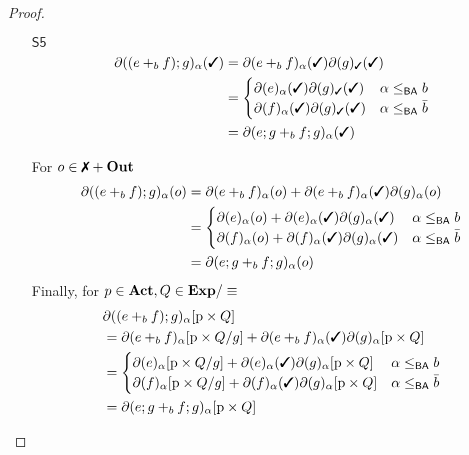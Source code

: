 \documentclass[a4paper,UKenglish,cleveref, autoref, thm-restate]{lipics-v2021}
\newcommand{\cmark}{\text{\ding{51}}}
\newcommand{\xmark}{\text{\ding{55}}}
\newcommand{\Out}{\textbf{\upshape{Out}}}
\newcommand{\Act}{\textbf{\upshape{Act}}}
\newcommand{\Exp}{\textbf{\upshape{Exp}}}
\newcommand{\BA}{\textsf{BA}}
\newcommand{\Ax}[1]{\ensuremath{\mathsf{#1}}}
\theoremstyle{plain}\newtheoremrep{thm}{Theorem}[section]
\begin{document}
\begin{toappendix}
\begin{proof}
\begin{enumerate}
				\item[\Ax{S5}] 
				\begin{align*}
					\partial((e+_bf);g)_\alpha(\cmark) &= \partial(e+_bf)_\alpha(\cmark)\partial(g)_\cmark(\cmark)\\
					&= \begin{cases}
						\partial(e)_\alpha(\cmark)\partial(g)_\cmark(\cmark) & \alpha \leq_{\BA} b\\
						\partial(f)_\alpha(\cmark)\partial(g)_\cmark(\cmark) & \alpha \leq_{\BA} \bar b\\
					\end{cases}\\
					&= \partial(e;g +_b f;g)_\alpha(\cmark)
				\end{align*}		
				
				For $o \in \xmark + \Out$ 
				\begin{align*}
					\partial((e+_bf);g)_\alpha(o) &= \partial(e+_bf)_\alpha(o) + \partial(e+_bf)_\alpha(\cmark)\partial(g)_\alpha(o)\\
					&= \begin{cases}
						\partial(e)_\alpha(o)+\partial(e)_\alpha(\cmark)\partial(g)_\alpha(\cmark) & \alpha \leq_{\BA} b\\
						\partial(f)_\alpha(o)+\partial(f)_\alpha(\cmark)\partial(g)_\alpha(\cmark) & \alpha \leq_{\BA} \bar b\\
					\end{cases}\\
					&= \partial(e;g +_b f;g)_\alpha(o)
				\end{align*}
				Finally, for $p \in \Act, Q \in \Exp/\equiv$
				\begin{align*}
					&\partial((e+_bf);g)_\alpha[\text{p} \times Q]\\
					&= \partial(e+_bf)_\alpha[\text{p} \times Q/g] + \partial(e+_bf)_\alpha(\cmark)\partial(g)_\alpha[\text{p} \times Q]\\
					&= \begin{cases}
						\partial(e)_\alpha[\text{p} \times Q/g] + \partial(e)_\alpha(\cmark)\partial(g)_\alpha[\text{p} \times Q] & \alpha \leq_{\BA} b\\
						\partial(f)_\alpha[\text{p} \times Q/g] + \partial(f)_\alpha(\cmark)\partial(g)_\alpha[\text{p} \times Q] & \alpha \leq_{\BA} \bar b\\
					\end{cases}\\
					&= \partial(e;g +_b f;g)_\alpha[\text{p} \times Q]
				\end{align*}

\end{enumerate}
\end{proof}
\end{toappendix}
\end{document}

